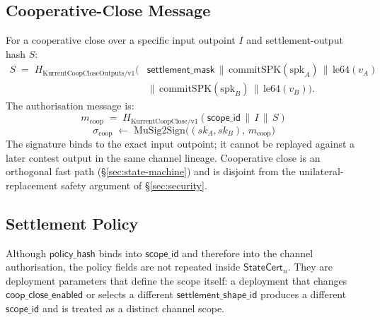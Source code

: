 \documentclass[10pt,a4paper]{article}
\begin{document}
\subsection{Cooperative-Close Message}
\label{sec:coop-close}

For a cooperative close over a specific input outpoint $I$ and settlement-output hash $S$:
\[
  \begin{aligned}
  S \;=\; H_{\mathrm{KurrentCoopCloseOutputs/v1}}\bigl(&
   \mathsf{settlement\_mask} \,\|\, \mathrm{commitSPK}(\mathrm{spk}_A) \,\|\, \mathrm{le64}(v_A) \\
   & \|\, \mathrm{commitSPK}(\mathrm{spk}_B) \,\|\, \mathrm{le64}(v_B)\bigr).
  \end{aligned}
\]
The authorisation message is:
\[
  m_{\mathrm{coop}} \;=\; H_{\mathrm{KurrentCoopClose/v1}}
   (\mathsf{scope\_id} \,\|\, I \,\|\, S)
\]
\[
  \sigma_{\mathrm{coop}} \;\leftarrow\; \mathrm{MuSig2Sign}
   \bigl((sk_A, sk_B),\, m_{\mathrm{coop}}\bigr)
\]
The signature binds to the exact input outpoint; it cannot be replayed against a later contest output in the same channel lineage. Cooperative close is an orthogonal fast path (§\ref{sec:state-machine}) and is disjoint from the unilateral-replacement safety argument of §\ref{sec:security}.

\subsection{Settlement Policy}
\label{sec:policy}

Although $\mathsf{policy\_hash}$ binds into $\mathsf{scope\_id}$ and therefore into the channel authorisation, the policy fields are not repeated inside $\mathsf{StateCert}_n$. They are deployment parameters that define the scope itself: a deployment that changes $\mathsf{coop\_close\_enabled}$ or selects a different $\mathsf{settlement\_shape\_id}$ produces a different $\mathsf{scope\_id}$ and is treated as a distinct channel scope.
\end{document}
